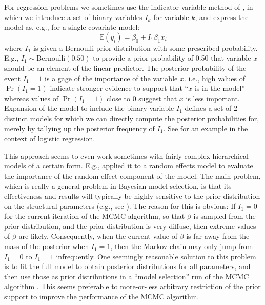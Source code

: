 {{{For regression problems we sometimes use the indicator variable method
of \citet{kuo_mallick:1998}, in 
which we introduce a set of binary variables $I_{k}$ for variable
$k$, and express the model as, e.g., for a single covariate model:
 \[
 \mathbb{E}(y_i) = \beta_0 + I_{1} \beta_1 x_{i}
\]
where $I_{1}$ is given a Bernoulli prior distribution with some prescribed
probability. E.g., $I_{1} \sim \mbox{Bernoulli}(0.50)$ to provide a prior probability
of 0.50 that variable $x$ should be an element of the linear
predictor. The posterior probability of the event $I_{1}=1$ is a gage of
the importance of the variable $x$. i.e., high values of $\Pr(I_{1}=1)$
indicate stronger evidence to support that ``$x$ is in the model''
whereas values of $\Pr(I_{1}=1)$ close to 0 suggest that $x$ is less
important.  Expansion of the model to include the binary variable
$I_{1}$ defines a set of 2 distinct models for which we can directly
compute the posterior probabilities for, merely by tallying up the
posterior frequency of $I_{1}$. See
\citet[][Chapt. 3]{royle_dorazio:2008} for an example in the context
of logistic regression. 

This approach seems to even work sometimes
with fairly complex hierarchical models of a certain form. E.g.,
\citet{royle:2008} applied it to a random effects model to evaluate
the importance of the random effect component of the model.  The main
problem, which is really a general problem in Bayesian model
selection, is that its effectiveness and results will
typically be highly sensitive to the prior distribution on the
structural parameters (e.g., see \citet[][table 3.6]{royle_dorazio:2008}).
The reason for this is obvious: If $I_{1} = 0$ for the current
iteration of the MCMC algorithm, so that $\beta$ is sampled from the
prior distribution, and the prior distribution is very diffuse, then
extreme values of $\beta$ are likely. Consequently, when the current value of
$\beta$ is
far away from the mass of the posterior when $I_{1}=1$, then the Markov
chain may only jump from $I_{1}=0$ to $I_{1}=1$ infrequently.  One seemingly
reasonable solution to this problem 
is to fit the full
model to obtain posterior distributions for all parameters, and then
use those as prior distributions in a ``model selection'' run of the
MCMC algorithm \citep{aitkin:1991}.  This seems preferable to more-or-less arbitrary restriction of
the prior support to improve the performance of the MCMC algorithm.

}}}
